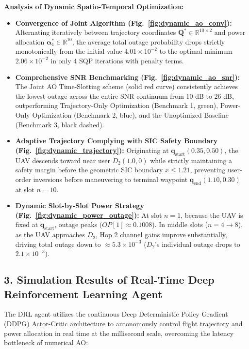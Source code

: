 \noindent \textbf{Analysis of Dynamic Spatio-Temporal Optimization:}
\begin{itemize}
    \item \textbf{Convergence of Joint Algorithm (Fig.~\ref{fig:dynamic_ao_conv}):} Alternating iteratively between trajectory coordinates $\mathbf{Q}^* \in \mathbb{R}^{10 \times 2}$ and power allocation $\boldsymbol{\alpha}_1^* \in \mathbb{R}^{10}$, the average total outage probability drops strictly monotonically from the initial value $4.01 \times 10^{-2}$ to the optimal minimum $2.06 \times 10^{-2}$ in only 4 SQP iterations with penalty terms.
    \item \textbf{Comprehensive SNR Benchmarking (Fig.~\ref{fig:dynamic_ao_snr}):} The Joint AO Time-Slotting scheme (solid red curve) consistently achieves the lowest outage across the entire SNR continuum from $10$ dB to $26$ dB, outperforming Trajectory-Only Optimization (Benchmark 1, green), Power-Only Optimization (Benchmark 2, blue), and the Unoptimized Baseline (Benchmark 3, black dashed).
    \item \textbf{Adaptive Trajectory Complying with SIC Safety Boundary (Fig.~\ref{fig:dynamic_trajectory}):} Originating at $\mathbf{q}_{\text{start}}(0.35, 0.50)$, the UAV descends toward near user $D_2(1.0, 0)$ while strictly maintaining a safety margin before the geometric SIC boundary $x \le 1.21$, preventing user-order inversions before maneuvering to terminal waypoint $\mathbf{q}_{\text{end}}(1.10, 0.30)$ at slot $n = 10$.
    \item \textbf{Dynamic Slot-by-Slot Power Strategy (Fig.~\ref{fig:dynamic_power_outage}):} At slot $n = 1$, because the UAV is fixed at $\mathbf{q}_{\text{start}}$, outage peaks ($OP[1] \approx 0.1008$). In middle slots ($n = 4 \to 8$), as the UAV approaches $D_2$, Hop 2 channel gains improve substantially, driving total outage down to $\approx 5.3 \times 10^{-3}$ ($D_2$'s individual outage drops to $2.1 \times 10^{-3}$).
\end{itemize}

\subsection*{3. Simulation Results of Real-Time Deep Reinforcement Learning Agent}

The DRL agent utilizes the continuous Deep Deterministic Policy Gradient (DDPG) Actor-Critic architecture to autonomously control flight trajectory and power allocation in real time at the millisecond scale, overcoming the latency bottleneck of numerical AO:

